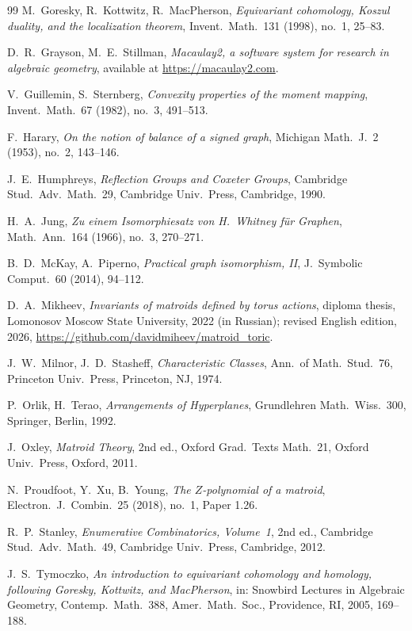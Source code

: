 \documentclass[11pt,a4paper]{article}
\numberwithin{equation}{section}
\theoremstyle{plain}
\theoremstyle{definition}
\theoremstyle{remark}
\begin{document}
\begin{thebibliography}{99}
 M.~Goresky, R.~Kottwitz, R.~MacPherson, \emph{Equivariant cohomology, Koszul duality, and the localization theorem}, Invent.\ Math.\ 131 (1998), no.~1, 25--83.

 D.~R.~Grayson, M.~E.~Stillman, \emph{Macaulay2, a software system for research in algebraic geometry}, available at \url{https://macaulay2.com}.

 V.~Guillemin, S.~Sternberg, \emph{Convexity properties of the moment mapping}, Invent.\ Math.\ 67 (1982), no.~3, 491--513.

 F.~Harary, \emph{On the notion of balance of a signed graph}, Michigan Math.\ J.\ 2 (1953), no.~2, 143--146.

 J.~E.~Humphreys, \emph{Reflection Groups and Coxeter Groups}, Cambridge Stud.\ Adv.\ Math.\ 29, Cambridge Univ.\ Press, Cambridge, 1990.

 H.~A.~Jung, \emph{Zu einem Isomorphiesatz von H.~Whitney für Graphen}, Math.\ Ann.\ 164 (1966), no.~3, 270--271.

 B.~D.~McKay, A.~Piperno, \emph{Practical graph isomorphism, II}, J.\ Symbolic Comput.\ 60 (2014), 94--112.

 D.~A.~Mikheev, \emph{Invariants of matroids defined by torus actions}, diploma thesis, Lomonosov Moscow State University, 2022 (in Russian); revised English edition, 2026, \url{https://github.com/davidmiheev/matroid_toric}.

 J.~W.~Milnor, J.~D.~Stasheff, \emph{Characteristic Classes}, Ann.\ of Math.\ Stud.\ 76, Princeton Univ.\ Press, Princeton, NJ, 1974.

 P.~Orlik, H.~Terao, \emph{Arrangements of Hyperplanes}, Grundlehren Math.\ Wiss.\ 300, Springer, Berlin, 1992.

 J.~Oxley, \emph{Matroid Theory}, 2nd ed., Oxford Grad.\ Texts Math.\ 21, Oxford Univ.\ Press, Oxford, 2011.

 N.~Proudfoot, Y.~Xu, B.~Young, \emph{The $Z$-polynomial of a matroid}, Electron.\ J.\ Combin.\ 25 (2018), no.~1, Paper 1.26.

 R.~P.~Stanley, \emph{Enumerative Combinatorics, Volume~1}, 2nd ed., Cambridge Stud.\ Adv.\ Math.\ 49, Cambridge Univ.\ Press, Cambridge, 2012.

 J.~S.~Tymoczko, \emph{An introduction to equivariant cohomology and homology, following Goresky, Kottwitz, and MacPherson}, in: Snowbird Lectures in Algebraic Geometry, Contemp.\ Math.\ 388, Amer.\ Math.\ Soc., Providence, RI, 2005, 169--188.


\end{thebibliography}
\end{document}
